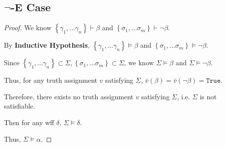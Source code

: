 \documentclass{article}
\newcommand{\set}[1]{\left\{#1\right\}}
\begin{document}
\subsection{$\boldsymbol{\neg}$-E Case}
\vspace{1em}
\begin{proof}
    We know $\set{\gamma_1,...\gamma_n}\vdash\beta$ and $\set{\sigma_1,...\sigma_m}\vdash\neg\beta$.

    \hspace{1.3em}
    By \textbf{Inductive Hypothesis}, $\set{\gamma_1,...\gamma_n}\vDash\beta$ and $\set{\sigma_1,...\sigma_m}\vDash\neg\beta$.

    \hspace{1.3em}
    Since $\set{\gamma_1,...\gamma_n}\subset\Sigma,\set{\sigma_1,...\sigma_m}\subset\Sigma$, we know $\Sigma\vDash\beta$ and $\Sigma\vDash\neg\beta$.
    
    \hspace{1.3em}
    Thus, for any truth assignment $v$ satisfying $\Sigma$, $\bar{v}(\beta)=\bar{v}(\neg\beta)=\mathtt{True}$.

    \hspace{1.3em}
    Therefore, there exists no truth assignment $v$ satisfying $\Sigma$, i.e. $\Sigma$ is not satisfiable. 
    
    \hspace{1.3em}
    Then for any wff $\delta$, $\Sigma\vDash\delta$.

    \hspace{1.3em}
    Thus, $\Sigma\vDash\alpha$.
\end{proof}
\end{document}
